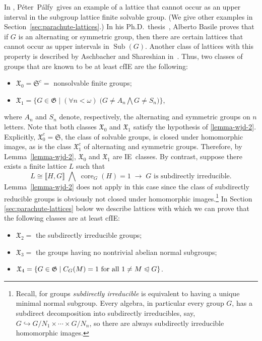 \documentclass{gen-j-l}
\newcommand{\lb}{\ensuremath{\llbracket}}
\newcommand{\rb}{\ensuremath{\rrbracket}}
\newcommand{\<}{\ensuremath{\langle}}
\renewcommand{\>}{\ensuremath{\rangle}}
\theoremstyle{plain}
\theoremstyle{definition}
\theoremstyle{remark}
\numberwithin{theorem}{section}
\numberwithin{claim}{section}
\numberwithin{equation}{section}
\numberwithin{conjecture}{section}
\newcommand{\Peter}{P{\'e}ter}
\newcommand{\Palfy}{P\'alfy}
\newcommand{\defn}[1]{\emph{#1}}
\newcommand{\subnormal}{\ensuremath{\trianglelefteqslant}}
\newcommand{\Meet}{\ensuremath{\bigwedge}}
\newcommand{\Sub}{\ensuremath{\operatorname{Sub}}}
\newcommand{\core}{\ensuremath{\operatorname{core}}}
\newcommand{\2}{\ensuremath{\mathbf{2}}}
\newcommand{\3}{\ensuremath{\mathbf{3}}}
\newcommand{\sG}{\ensuremath{\mathfrak{X}}}
\newcommand{\G}{\ensuremath{\mathfrak{G}}}
\newcommand{\IE}{{\small IE}}
\begin{document}
In \cite{Palfy:1995}, \Peter\ \Palfy\ gives an example of a lattice that cannot occur as an
upper interval in the subgroup lattice finite solvable group.  (We give other examples
in Section~\ref{sec:parachute-lattices}.) %
In his Ph.D.~thesis~\cite{Basile:2001}, Alberto Basile proves that if
$G$ is an alternating or symmetric group, then there are certain lattices that
cannot occur as upper intervals in $\Sub(G)$. Another class of lattices with
this property is described by Aschbacher and Shareshian in~\cite{Aschbacher:2009}. 
Thus, two classes of groups that are known to be at least \acs{cfIE} are the following:
\begin{itemize}
\item $\sG_0 = \mathfrak{S}^c = $ nonsolvable finite groups;
\item $\sG_1 =\bigl\{G\in \G \mid (\forall n<\omega) \; \bigl(G \neq A_n \Meet  G\neq S_n\bigr) \bigr\}$,
\end{itemize}
where $A_n$ and $S_n$ denote, respectively,
the alternating and symmetric groups on
$n$ letters.
Note that both classes $\sG_0$ and $\sG_1$ satisfy the hypothesis of \ref{lemma-wjd-2}.
Explicitly, $\sG_0^c = \mathfrak{S}$, the class of solvable groups, is closed under homomorphic
images, as is the class $\sG_1^c$ of alternating and symmetric groups. 
Therefore, by Lemma~\ref{lemma-wjd-2}, $\sG_0$ and $\sG_1$ are \IE\ classes.
By contrast, suppose %
there exists a finite lattice $L$ such that
 \[
L \cong \lb H, G \rb \; \Meet \; \core_G(H)=1 \; \longrightarrow \; G
 \text{ is subdirectly irreducible.}  %
\]
Lemma~\ref{lemma-wjd-2} does not apply in this case since the class of
subdirectly reducible groups is obviously not closed under homomorphic 
images.\footnote{Recall, for groups \defn{subdirectly irreducible} is equivalent
  to having a unique minimal normal subgroup.
 Every algebra, in particular every group $G$, has a subdirect
  decomposition into subdirectly irreducibles, say, $G\hookrightarrow G/N_1 \times \cdots\times
  G/N_n$, so there are always  subdirectly irreducible homomorphic images.}
In Section \ref{sec:parachute-lattices} %
below we describe
lattices with which we can prove that the following classes are at least 
\acs{cfIE}: 
\begin{itemize}
\item $\sG_2 = $ the subdirectly irreducible groups;
\item $\sG_3 = $ the groups having no nontrivial abelian normal subgroups;
\item $\sG_4 = \{G\in \G \mid C_G(M) = 1 \text{ for all } 1\neq M\subnormal G\}$.
\end{itemize}
\end{document}
